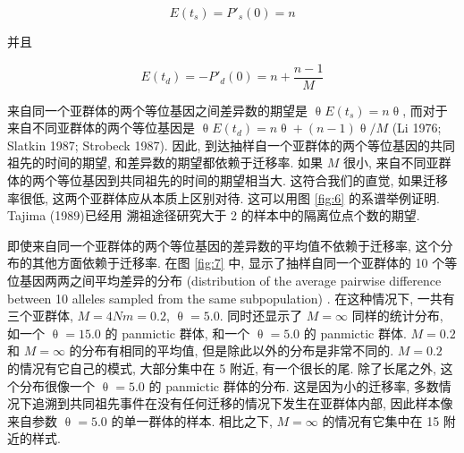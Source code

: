 \documentclass[12pt]{article}
\begin{document}
\begin{equation} \label{eq:23}
    E(t_{s}) = P'_{s}(0) = n
\end{equation}

并且

\begin{equation} \label{eq:24}
    E(t_{d}) = -P'_{d}(0) = n + \frac{n-1}{M}
\end{equation}

来自同一个亚群体的两个等位基因之间差异数的期望是 $\uptheta E(t_{s}) = n \uptheta$, 而对于来自不同亚群体的两个等位基因是
$\uptheta E(t_{d}) = n \uptheta +(n-1)\uptheta /M$ (Li 1976; Slatkin 1987; Strobeck 1987).
因此, 到达抽样自一个亚群体的两个等位基因的共同祖先的时间的期望, 和差异数的期望都依赖于迁移率.
如果 $M$ 很小, 来自不同亚群体的两个等位基因到共同祖先的时间的期望相当大.
这符合我们的直觉, 如果迁移率很低, 这两个亚群体应从本质上区别对待. 这可以用图 \ref{fig:6} 的系谱举例证明.
Tajima (1989)已经用 溯祖途径研究大于 2 的样本中的隔离位点个数的期望.

即使来自同一个亚群体的两个等位基因的差异数的平均值不依赖于迁移率, 这个分布的其他方面依赖于迁移率. 在图 \ref{fig:7} 中,
显示了抽样自同一个亚群体的 10 个等位基因两两之间平均差异的分布 (distribution of the average pairwise difference
between 10 alleles sampled from the same subpopulation) . 在这种情况下, 一共有三个亚群体, $M=4Nm=0.2$,
$\uptheta =5.0$. 同时还显示了 $M=\mathrm{\infty}$ 同样的统计分布, 如一个 $\uptheta =15.0$ 的 panmictic 群体,
和一个 $\uptheta =5.0$ 的 panmictic 群体. $M=0.2$ 和 $M=\mathrm{\infty}$ 的分布有相同的平均值,
但是除此以外的分布是非常不同的. $M=0.2$ 的情况有它自己的模式, 大部分集中在 5 附近, 有一个很长的尾. 除了长尾之外,
这个分布很像一个 $\uptheta =5.0$ 的 panmictic 群体的分布. 这是因为小的迁移率,
多数情况下追溯到共同祖先事件在没有任何迁移的情况下发生在亚群体内部, 因此样本像来自参数 $\uptheta =5.0$ 的单一群体的样本.
相比之下, $M=\mathrm{\infty }$ 的情况有它集中在 15 附近的样式.
\end{document}
